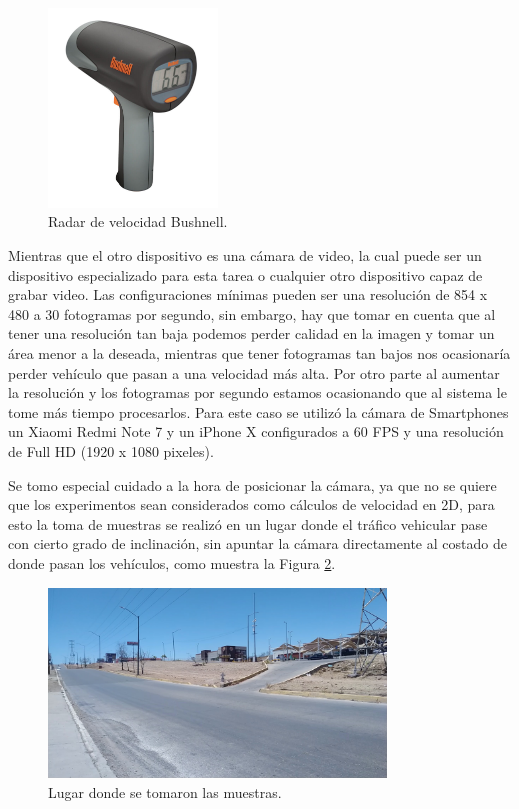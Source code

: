 \begin{figure}[H]
    \centering
    \includegraphics[width=0.4\textwidth]{Metodologia/imgs/bushnell.jpg}
    \caption{Radar de velocidad Bushnell.}
    \label{fig:RadarVelocidad}
\end{figure}

Mientras que el otro dispositivo es una cámara de video, la cual puede ser un dispositivo especializado para esta tarea o cualquier otro dispositivo capaz de grabar video. Las configuraciones mínimas pueden ser una resolución de 854 x 480 a 30 fotogramas por segundo, sin embargo, hay que tomar en cuenta que al tener una resolución tan baja podemos perder calidad en la imagen y tomar un área menor a la deseada, mientras que tener fotogramas tan bajos nos ocasionaría perder vehículo que pasan a una velocidad más alta. Por otro parte al aumentar la resolución y los fotogramas por segundo estamos ocasionando que al sistema le tome más tiempo procesarlos. Para este caso se utilizó la cámara de Smartphones un Xiaomi Redmi Note 7 y un iPhone X configurados a 60 FPS y una resolución de Full HD (1920 x 1080 pixeles).

Se tomo especial cuidado a la hora de posicionar la cámara, ya que no se quiere que los experimentos sean considerados como cálculos de velocidad en 2D, para esto la toma de muestras se realizó en un lugar donde el tráfico vehicular pase con cierto grado de inclinación, sin apuntar la cámara directamente al costado de donde pasan los vehículos, como muestra la Figura \ref{fig:LugarMuestras}.

\begin{figure}[H]
    \centering
    \includegraphics[width=0.8\textwidth]{Metodologia/imgs/LugarMuestras.jpg}
    \caption{Lugar donde se tomaron las muestras.}
    \label{fig:LugarMuestras}
\end{figure}

